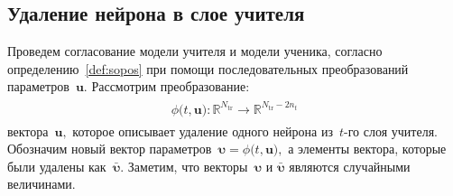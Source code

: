\documentclass[12pt]{a&t}
\begin{document}
\subsection{Удаление нейрона в слое учителя}
Проведем согласование модели учителя и модели ученика, согласно определению~\ref{def:sopos} при помощи последовательных преобразований параметров~$\mathbf{u}$. Рассмотрим преобразование:
\begin{gather}
\label{eq:ap:2}
\begin{aligned}
\phi\bigr(t, \mathbf{u}\bigr) : \mathbb{R}^{N_{\text{tr}}} \to \mathbb{R}^{N_{\text{tr}}-2n_t}
\end{aligned}
\end{gather}
вектора~$\mathbf{u},$ которое описывает удаление одного нейрона из~$t$-го слоя учителя.
Обозначим новый вектор параметров~$\bm{\upsilon} =  \phi\bigr(t, \mathbf{u}\bigr),$ а элементы вектора, которые были удалены как~$\bar{\bm{\upsilon}}.$ Заметим, что векторы~$\bm{\upsilon}$ и $\bar{\bm{\upsilon}}$ являются случайными величинами. 
\end{document}

